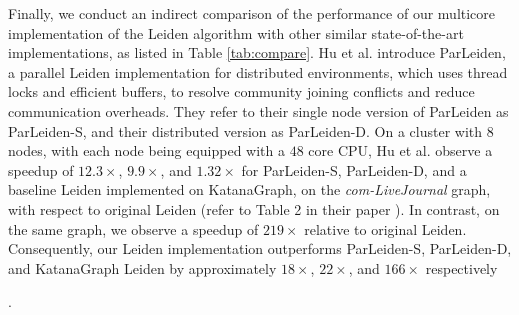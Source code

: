 Finally, we conduct an indirect comparison of the performance of our multicore implementation of the Leiden algorithm with other similar state-of-the-art implementations, as listed in Table \ref{tab:compare}. Hu et al. \cite{huparleiden} introduce ParLeiden, a parallel Leiden implementation for distributed environments, which uses thread locks and efficient buffers, to resolve community joining conflicts and reduce communication overheads. They refer to their single node version of ParLeiden as ParLeiden-S, and their distributed version as ParLeiden-D. On a cluster with $8$ nodes, with each node being equipped with a $48$ core CPU, Hu et al. observe a speedup of $12.3\times$, $9.9\times$, and $1.32\times$ for ParLeiden-S, ParLeiden-D, and a baseline Leiden implemented on KatanaGraph, on the \textit{com-LiveJournal} graph, with respect to original Leiden \cite{com-traag19} (refer to Table 2 in their paper \cite{huparleiden}). In contrast, on the same graph, we observe a speedup of $219\times$ relative to original Leiden. Consequently, our Leiden implementation outperforms ParLeiden-S, ParLeiden-D, and KatanaGraph Leiden by approximately $18\times$, $22\times$, and $166\times$ respectively.
